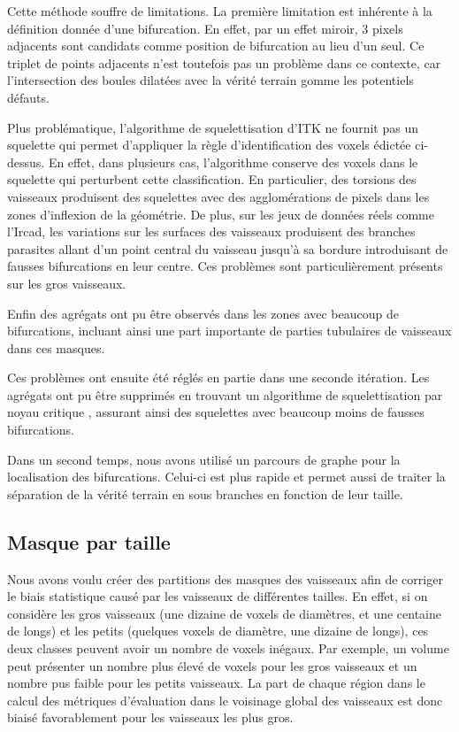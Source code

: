 Cette méthode souffre de limitations. La première limitation est inhérente à la définition donnée d'une bifurcation. En effet, par un effet miroir, 3 pixels adjacents sont candidats comme position de bifurcation au lieu d'un seul. Ce triplet de points adjacents n'est toutefois pas un problème dans ce contexte, car l'intersection des boules dilatées avec la vérité terrain gomme les potentiels défauts.

Plus problématique, l'algorithme de squelettisation d'ITK ne fournit pas un squelette qui permet d'appliquer la règle d'identification des voxels édictée ci-dessus. En effet, dans plusieurs cas, l'algorithme conserve des voxels dans le squelette qui perturbent cette classification. En particulier, des torsions des vaisseaux produisent des squelettes avec des agglomérations de pixels dans les zones d'inflexion de la géométrie. De plus, sur les jeux de données réels comme l'Ircad, les variations sur les surfaces des vaisseaux produisent des branches parasites allant d'un point central du vaisseau jusqu'à sa bordure introduisant de fausses bifurcations en leur centre. Ces problèmes sont particulièrement présents sur les gros vaisseaux.

Enfin des agrégats ont pu être observés dans les zones avec beaucoup de bifurcations, incluant ainsi une part importante de parties tubulaires de vaisseaux dans ces masques.

Ces problèmes ont ensuite été réglés en partie dans une seconde itération. Les agrégats ont pu être supprimés en trouvant un algorithme de squelettisation par noyau critique \cite{Bertrand2006_critical_kernel}, assurant ainsi des squelettes avec beaucoup moins de fausses bifurcations.

Dans un second temps, nous avons utilisé un parcours de graphe pour la localisation des bifurcations. Celui-ci est plus rapide et permet aussi de traiter la séparation de la vérité terrain en sous branches en fonction de leur taille.

\subsection{Masque par taille}

Nous avons voulu créer des partitions des masques des vaisseaux afin de corriger le biais statistique causé par les vaisseaux de différentes tailles. En effet, si on considère les gros vaisseaux (une dizaine de voxels de diamètres, et une centaine de longs) et les petits (quelques voxels de diamètre, une dizaine de longs), ces deux classes peuvent avoir un nombre de voxels inégaux. Par exemple, un volume peut présenter un nombre plus élevé de voxels pour les gros vaisseaux et un nombre pus faible pour les petits vaisseaux. La part de chaque région dans le calcul des métriques d'évaluation dans le voisinage global des vaisseaux est donc biaisé favorablement pour les vaisseaux les plus gros.

